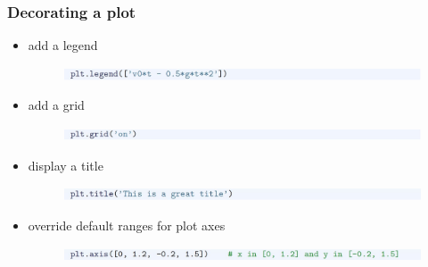 \documentclass[14pt]{beamer}
\begin{document}

\begin{frame}[fragile]
\frametitle{Decorating a plot}

\begin{itemize}
\item add a legend
\vspace*{-5mm}
\begin{figure}[ht]
	\centering
	\includegraphics[width=\textwidth]{figures/LLp24c}
\end{figure}

\item add a grid
\vspace*{-5mm}
\begin{figure}[ht]
	\centering
	\includegraphics[width=\textwidth]{figures/LLp24d}
\end{figure}
\item display a title
\vspace*{-5mm}
\begin{figure}[ht]
	\centering
	\includegraphics[width=\textwidth]{figures/LLp24e}
\end{figure}
\item override default ranges for plot axes
\vspace*{-5mm}
\begin{figure}[ht]
	\centering
	\includegraphics[width=\textwidth]{figures/LLp24f}
\end{figure}
\end{itemize}

\end{frame}

\end{document}
